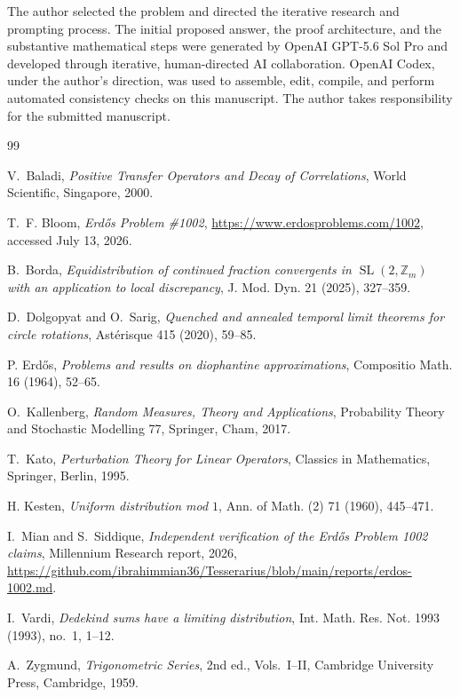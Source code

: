 \documentclass[11pt,a4paper]{amsart}
\theoremstyle{definition}
\theoremstyle{remark}
\begin{document}
The author selected the problem and directed the iterative research and
prompting process.  The initial proposed answer, the proof architecture, and
the substantive mathematical steps were generated by OpenAI GPT-5.6 Sol Pro
and developed through iterative, human-directed AI collaboration.  OpenAI
Codex, under the author's direction, was used to assemble, edit, compile, and
perform automated consistency checks on this manuscript.  The author takes
responsibility for the submitted manuscript.

\begin{thebibliography}{99}

V.~Baladi,
\emph{Positive Transfer Operators and Decay of Correlations},
World Scientific, Singapore, 2000.

T.~F. Bloom,
\emph{Erd\H{o}s Problem \#1002},
\url{https://www.erdosproblems.com/1002}, accessed July 13, 2026.

B.~Borda,
\emph{Equidistribution of continued fraction convergents in
$\operatorname{SL}(2,\mathbb Z_m)$ with an application to local discrepancy},
J. Mod. Dyn. 21 (2025), 327--359.

D.~Dolgopyat and O.~Sarig,
\emph{Quenched and annealed temporal limit theorems for circle rotations},
Ast\'erisque 415 (2020), 59--85.

P. Erd\H{o}s,
\emph{Problems and results on diophantine approximations},
Compositio Math. 16 (1964), 52--65.

O.~Kallenberg,
\emph{Random Measures, Theory and Applications},
Probability Theory and Stochastic Modelling 77,
Springer, Cham, 2017.

T.~Kato,
\emph{Perturbation Theory for Linear Operators},
Classics in Mathematics, Springer, Berlin, 1995.

H. Kesten,
\emph{Uniform distribution mod $1$},
Ann. of Math. (2) 71 (1960), 445--471.

I.~Mian and S.~Siddique,
\emph{Independent verification of the Erd\H{o}s Problem 1002 claims},
Millennium Research report, 2026,
\url{https://github.com/ibrahimmian36/Tesserarius/blob/main/reports/erdos-1002.md}.

I.~Vardi,
\emph{Dedekind sums have a limiting distribution},
Int. Math. Res. Not. 1993 (1993), no.~1, 1--12.

A.~Zygmund,
\emph{Trigonometric Series}, 2nd ed., Vols.~I--II,
Cambridge University Press, Cambridge, 1959.

\end{thebibliography}
\end{document}
